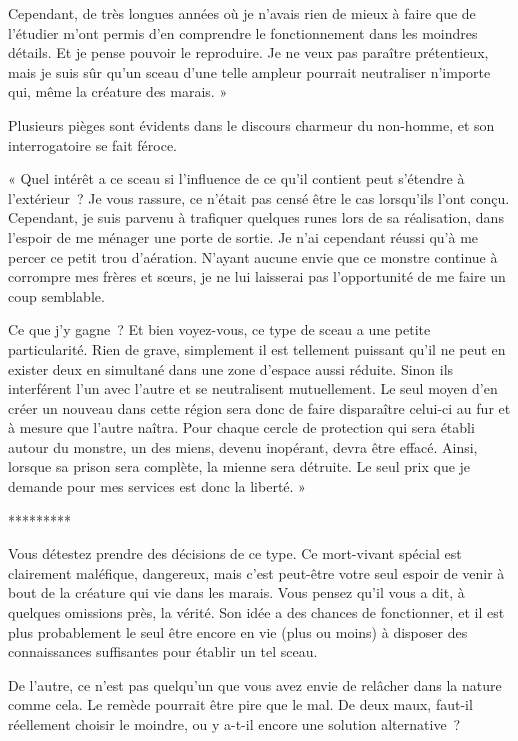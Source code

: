 \documentclass{report}
\newcommand{\ellipse}{
    \begin{center}
        *********
    \end{center}
}
\begin{document}
Cependant, de très longues années où je n'avais rien de mieux à faire que de l'étudier m'ont permis d'en comprendre le fonctionnement dans les moindres détails. Et je pense pouvoir le reproduire. Je ne veux pas paraître prétentieux, mais je suis sûr qu'un sceau d'une telle ampleur pourrait neutraliser n'importe qui, même la créature des marais. »

Plusieurs pièges sont évidents dans le discours charmeur du non-homme, et son interrogatoire se fait féroce.

« Quel intérêt a ce sceau si l'influence de ce qu'il contient peut s'étendre à l'extérieur ? Je vous rassure, ce n'était pas censé être le cas lorsqu'ils l'ont conçu. Cependant, je suis parvenu à trafiquer quelques runes lors de sa réalisation, dans l'espoir de me ménager une porte de sortie. Je n'ai cependant réussi qu'à me percer ce petit trou d'aération. N'ayant aucune envie que ce monstre continue à corrompre mes frères et sœurs, je ne lui laisserai pas l'opportunité de me faire un coup semblable.

Ce que j'y gagne ? Et bien voyez-vous, ce type de sceau a une petite particularité. Rien de grave, simplement il est tellement puissant qu'il ne peut en exister deux en simultané dans une zone d'espace aussi réduite. Sinon ils interférent l'un avec l'autre et se neutralisent mutuellement. Le seul moyen d'en créer un nouveau dans cette région sera donc de faire disparaître celui-ci au fur et à mesure que l'autre naîtra. Pour chaque cercle de protection qui sera établi autour du monstre, un des miens, devenu inopérant, devra être effacé. Ainsi, lorsque sa prison sera complète, la mienne sera détruite. Le seul prix que je demande pour mes services est donc la liberté. »

\ellipse

Vous détestez prendre des décisions de ce type. Ce mort-vivant spécial est clairement maléfique, dangereux, mais c'est peut-être votre seul espoir de venir à bout de la créature qui vie dans les marais. Vous pensez qu'il vous a dit, à quelques omissions près, la vérité. Son idée a des chances de fonctionner, et il est plus probablement le seul être encore en vie (plus ou moins) à disposer des connaissances suffisantes pour établir un tel sceau.

De l'autre, ce n'est pas quelqu'un que vous avez envie de relâcher dans la nature comme cela. Le remède pourrait être pire que le mal. De deux maux, faut-il réellement choisir le moindre, ou y a-t-il encore une solution alternative ?
\end{document}
